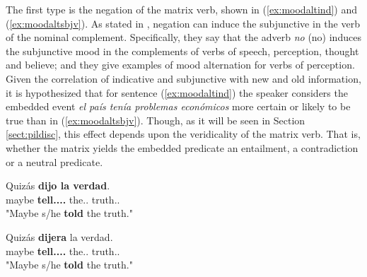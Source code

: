 The first type is the negation of the matrix verb, shown in (\ref{ex:moodaltind}) and (\ref{ex:moodaltsbjv}). As stated in \citet{espanola2010nueva}, negation can induce the subjunctive in the verb of the nominal complement. Specifically, they say that the adverb \textit{no} (no) induces the subjunctive mood in the complements of verbs of speech, perception, thought and believe; and they give examples of mood alternation for verbs of perception. Given the correlation of indicative and subjunctive with new and old information, it is hypothesized that for sentence (\ref{ex:moodaltind}) the speaker considers the embedded event \textit{el país tenía problemas económicos} more certain or likely to be true than in (\ref{ex:moodaltsbjv}). Though, as it will be seen in Section \ref{sect:pildisc}, this effect depends upon the veridicality of the matrix verb. That is, whether the matrix yields the embedded predicate an entailment, a contradiction or a neutral predicate.\\

\begin{exe}
  \ex
    \begin{xlist}
      \item{\gll Quizás \textbf{dijo la verdad}. \\ maybe \textbf{tell.\Pst.\Pfv.\Ind.\Tsg{}} the.\F.\Sg{} truth.\F.\Sg{} \\ "Maybe s/he \textbf{told} the truth."}\label{ex:moodaltindadv1}
      \item{\gll Quizás \textbf{dijera} la verdad.\\ maybe \textbf{tell.\Pst.\Pfv.\Sbjv.\Tsg{}} the.\F.\Sg{} truth.\F.\Sg{} \\ "Maybe s/he \textbf{told} the truth."}\label{ex:moodaltsbjvadv1}
    \end{xlist}
\end{exe}


